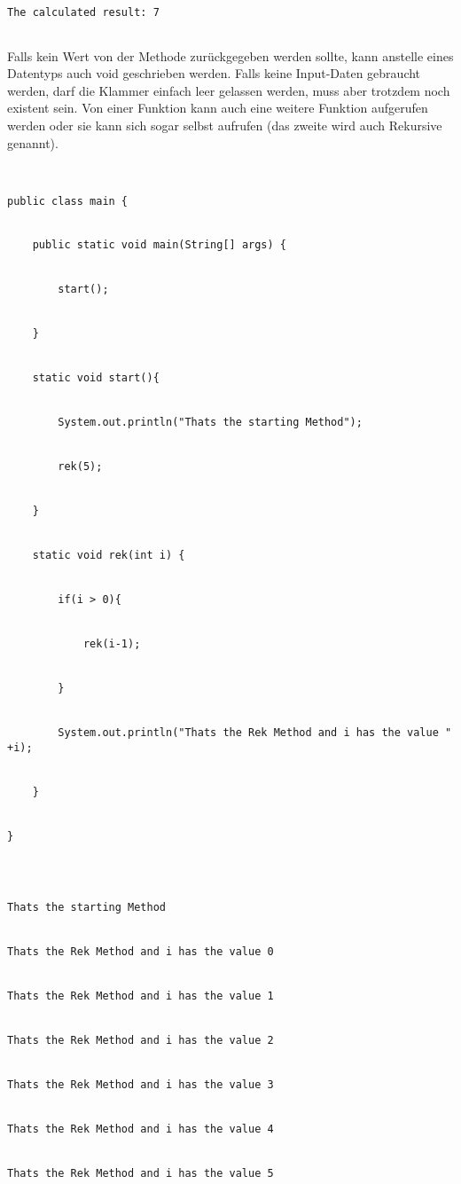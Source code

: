 \begin{lstlisting}[style=console]


The calculated result: 7


\end{lstlisting}


Falls kein Wert von der Methode zurückgegeben werden sollte, kann anstelle eines Datentyps auch void geschrieben werden. Falls keine Input-Daten gebraucht werden, darf die Klammer einfach leer gelassen werden, muss aber trotzdem noch existent sein. Von einer Funktion kann auch eine weitere Funktion aufgerufen werden oder sie kann sich sogar selbst aufrufen (das zweite wird auch Rekursive genannt).


\begin{lstlisting}


public class main {


	public static void main(String[] args) {


		start();


	}


	static void start(){


		System.out.println("Thats the starting Method");


		rek(5);


	}


	static void rek(int i) {


		if(i > 0){


			rek(i-1);


		}


		System.out.println("Thats the Rek Method and i has the value " +i);


	}


}


\end{lstlisting}


\begin{lstlisting}[style=console]


Thats the starting Method


Thats the Rek Method and i has the value 0


Thats the Rek Method and i has the value 1


Thats the Rek Method and i has the value 2


Thats the Rek Method and i has the value 3


Thats the Rek Method and i has the value 4


Thats the Rek Method and i has the value 5


\end{lstlisting}


